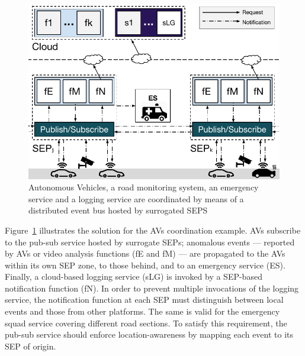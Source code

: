 \begin{figure}[tbp]
	\centering
	\includegraphics[width=1\linewidth]{Figs/Edge_Coordination_AVs_wide.pdf}
	\caption{Autonomous Vehicles, a road monitoring system, an emergency service and a logging service are coordinated by means of a distributed event bus hosted by surrogated SEPS}
	\label{fig:Edge_Coordination_AVs}
\end{figure}


Figure~\ref{fig:Edge_Coordination_AVs} illustrates the solution for the AVs coordination example. AVs subscribe to the pub-sub service hosted by surrogate SEPs; anomalous events --- reported by AVs or video analysis functions (fE and fM) --- are propagated to the AVs within its own SEP zone, to those behind, and to an emergency service (ES). Finally, a cloud-based logging service (sLG) is invoked by a SEP-based notification function (fN). In order to prevent multiple invocations of the logging service, the notification function at each SEP must distinguish between local events and those from other platforms. The same is valid for the emergency squad service covering different road sections. To satisfy this requirement, the pub-sub service should enforce location-awareness by mapping each event to its SEP of origin.



